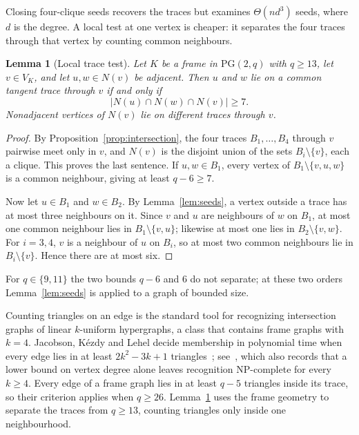 \documentclass[11pt]{article}
\newtheorem{lemma}[theorem]{Lemma}
\theoremstyle{definition}
\theoremstyle{remark}
\newcommand{\PG}{\mathrm{PG}}
\begin{document}
Closing four-clique seeds recovers the traces but examines
$\Theta(nd^3)$ seeds, where $d$ is the degree. A local test at one vertex
is cheaper: it separates the four traces through that vertex by counting
common neighbours.

\begin{lemma}[Local trace test]\label{lem:local-trace}
Let $K$ be a frame in $\PG(2,q)$ with $q\ge13$, let $v\in V_K$, and let
$u,w\in N(v)$ be adjacent. Then $u$ and $w$ lie on a common tangent
trace through $v$ if and only if
\[
 |N(u)\cap N(w)\cap N(v)|\ge7.
\]
Nonadjacent vertices of $N(v)$ lie on different traces through $v$.
\end{lemma}
\begin{proof}
By Proposition~\ref{prop:intersection}, the four traces $B_1,\dots,B_4$
through $v$ pairwise meet only in $v$, and $N(v)$ is the disjoint union of
the sets $B_i\setminus\{v\}$, each a clique. This proves the last
sentence. If $u,w\in B_1$, every vertex of $B_1\setminus\{v,u,w\}$ is a
common neighbour, giving at least $q-6\ge7$.

Now let $u\in B_1$ and $w\in B_2$. By Lemma~\ref{lem:seeds}, a vertex
outside a trace has at most three neighbours on it. Since $v$ and $u$
are neighbours of $w$ on $B_1$, at most one common neighbour lies in
$B_1\setminus\{v,u\}$; likewise at most one lies in $B_2\setminus\{v,w\}$.
For $i=3,4$, $v$ is a neighbour of $u$ on $B_i$, so at most two common
neighbours lie in $B_i\setminus\{v\}$. Hence there are at most six.
\end{proof}

For $q\in\{9,11\}$ the two bounds $q-6$ and $6$ do not separate; at
these two orders Lemma~\ref{lem:seeds} is applied to a graph of bounded
size.

Counting triangles on an edge is the standard tool for recognizing
intersection graphs of linear $k$-uniform hypergraphs, a class that
contains frame graphs with $k=4$. Jacobson, K\'ezdy and Lehel decide
membership in polynomial time when every edge lies in at least
$2k^2-3k+1$ triangles~\cite{JKL}; see~\cite[Section~5]{Naik}, which also
records that a lower bound on vertex degree alone leaves recognition
NP-complete for every $k\ge4$. Every edge of a frame graph lies in at
least $q-5$ triangles inside its trace, so their criterion applies when
$q\ge26$. Lemma~\ref{lem:local-trace} uses the frame geometry to separate
the traces from $q\ge13$, counting triangles only inside one
neighbourhood.
\end{document}
